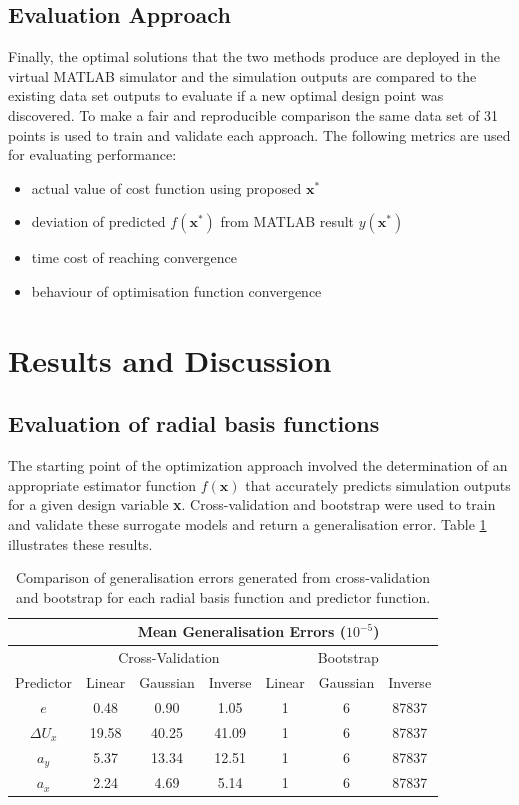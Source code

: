 \documentclass[conf]{new-aiaa}
\begin{document}
\subsection{Evaluation Approach}
Finally, the optimal solutions that the two methods produce are deployed in the virtual MATLAB simulator and the simulation outputs are compared to the existing data set outputs to evaluate if a new optimal design point was discovered. To make a fair and reproducible comparison the same data set of 31 points is used to train and validate each approach. The following metrics are used for evaluating performance:
\begin{itemize}
\item actual value of cost function using proposed $\textbf{x}^*$
\item deviation of predicted $f(\textbf{x}^*)$ from MATLAB result $y(\textbf{x}^*)$
\item time cost of reaching convergence
\item behaviour of optimisation function convergence
\end{itemize}

\section{Results and Discussion}

\subsection{Evaluation of radial basis functions}
The starting point of the optimization approach involved the determination of an appropriate estimator function $f(\textbf{x})$ that accurately predicts simulation outputs for a given design variable \textbf{x}. Cross-validation and bootstrap were used to train and validate these surrogate models and return a generalisation error. Table \ref{tab:cv_bs_rbf} illustrates these results.
\begin{table}[H]
  \centering
\begin{tabular}{|c|c c c|c c c|}
 \hline
 \cline{2-7} & \multicolumn{6}{|c|}{Mean Generalisation Errors ($10^{-5}$)}\\
 \hline
 \cline{2-7} & \multicolumn{3}{|c|}{Cross-Validation} & \multicolumn{3}{|c|}{Bootstrap}\\
 \hline
  Predictor &Linear & Gaussian & Inverse & Linear & Gaussian & Inverse \\ [0.5ex] 
 \hline
 $e$ & 0.48 & 0.90 & 1.05 & 1 & 6 & 87837\\
 \hline
 $\Delta U_x$ & 19.58 & 40.25 & 41.09 & 1 & 6 & 87837\\
 \hline
 $a_y$ & 5.37 & 13.34 & 12.51 & 1 & 6 & 87837\\
 \hline
 $a_x$ & 2.24 & 4.69 & 5.14 & 1 & 6 & 87837\\ [0.5ex] 
 \hline
\end{tabular}
\caption{\label{tab:cv_bs_rbf}Comparison of generalisation errors generated from cross-validation and bootstrap for each radial basis function and predictor function.}
\end{table}
\end{document}
